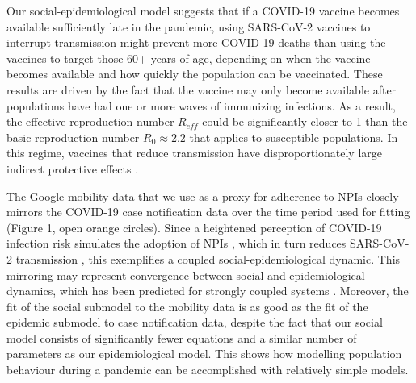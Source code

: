 Our social-epidemiological model suggests that if a COVID-19 vaccine becomes available sufficiently late in the pandemic, using SARS-CoV-2 vaccines to interrupt transmission might prevent more COVID-19 deaths than using the vaccines to target those 60+ years of age, depending on when the vaccine becomes available and how quickly the population can be vaccinated. These results are driven by the fact that the vaccine may only become available after populations have had one or more waves of immunizing infections. As a result, the effective reproduction number $R_{eff}$ could be significantly closer to 1 than the basic reproduction number $R_0 \approx 2.2$ that applies to susceptible populations. In this regime, vaccines that reduce transmission have disproportionately large indirect protective effects \cite{anderson1992infectious}.

The Google mobility data that we use as a proxy for adherence to NPIs closely mirrors the COVID-19 case notification data over the time period used for fitting (Figure 1, open orange circles).  Since a heightened perception of COVID-19 infection risk simulates the adoption of NPIs \cite{wise2020changes}, which in turn reduces SARS-CoV-2 transmission \cite{anderson2020estimating, peak2020individual}, this exemplifies a coupled  social-epidemiological dynamic. This mirroring may represent convergence between social and epidemiological dynamics, which has been predicted for strongly coupled systems \cite{sigdel2019convergence}. Moreover, the fit of the social submodel to the mobility data is as good as the fit of the epidemic submodel to case notification data, despite the fact that our social model consists of significantly fewer equations and a similar number of parameters as our epidemiological model. This shows how modelling population behaviour during a pandemic can be accomplished with relatively simple models. 

